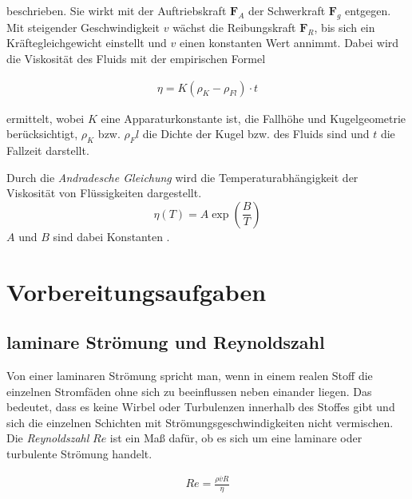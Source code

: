 beschrieben.
Sie wirkt mit der Auftriebskraft $\symbf{F}_A$ der Schwerkraft $\symbf{F}_g$ entgegen. 
Mit steigender Geschwindigkeit $v$ wächst die Reibungskraft $\symbf{F}_R$, bis sich ein Kräftegleichgewicht einstellt
und $v$ einen konstanten Wert annimmt.
Dabei wird die Viskosität des Fluids mit der empirischen Formel 

\begin{align}
    \eta = K \left(\rho_K -\rho_{Fl}\right) \cdot t
\end{align}

ermittelt, wobei $K$ eine Apparaturkonstante ist, die Fallhöhe und Kugelgeometrie berücksichtigt,
$\rho_K$ bzw. $\rho_Fl$ die Dichte der Kugel bzw. des Fluids sind und $t$ die Fallzeit darstellt.


Durch die \textit{Andradesche Gleichung} wird die Temperaturabhängigkeit der Viskosität von Flüssigkeiten dargestellt.
\begin{equation}
\label{eq:andrade}
    \eta \left(T\right) = A \exp{\left(\frac{B}{T}\right)}
\end{equation}
$A$ und $B$ sind dabei Konstanten \cite*[]{va207}.






\section{Vorbereitungsaufgaben}
\subsection{laminare Strömung und Reynoldszahl}
\label{sec:vorbereitung}
Von einer laminaren Strömung spricht man, wenn in einem realen Stoff
die einzelnen Stromfäden ohne sich zu beeinflussen neben einander liegen. Das bedeutet, dass es keine Wirbel oder
Turbulenzen innerhalb des Stoffes gibt und sich die einzelnen Schichten mit Strömungsgeschwindigkeiten nicht vermischen.
Die \textit{Reynoldszahl} $Re$ ist ein Maß dafür, ob es sich um eine laminare oder turbulente Strömung handelt.

\begin{align}
    Re = \frac{\rho \overline{v} R}{\eta}
\end{align}


